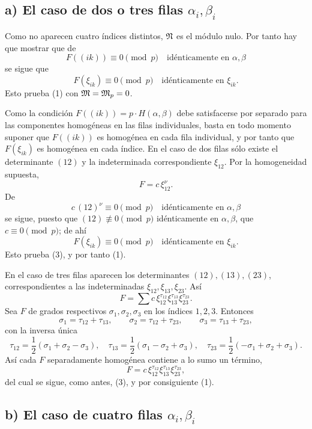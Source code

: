 \subsection*{a) El caso de dos o tres filas \(\alpha_i,\beta_i\)}

Como no aparecen cuatro índices distintos, \(\mathfrak N\) es el módulo nulo. Por tanto hay que mostrar que de
\begin{equation}
        F((ik))\equiv0\pmod p\quad \text{idénticamente en \(\alpha,\beta\)}
\end{equation}
se sigue que
\[
        F(\xi_{ik})\equiv0\pmod p\quad \text{idénticamente en \(\xi_{ik}\)}.
\]
Esto prueba (1) con \(\mathfrak M=\mathfrak M_p=0\).

Como la condición \(F((ik))=p\cdot H(\alpha,\beta)\) debe satisfacerse por separado para las componentes homogéneas en las filas individuales, basta en todo momento suponer que \(F((ik))\) es homogénea en cada fila individual, y por tanto que \(F(\xi_{ik})\) es homogénea en cada índice. En el caso de dos filas sólo existe el determinante \((12)\) y la indeterminada correspondiente \(\xi_{12}\). Por la homogeneidad supuesta,
\[
        F=c\,\xi_{12}^\nu.
\]
De
\[
        c\,(12)^\nu\equiv0\pmod p\quad \text{idénticamente en \(\alpha,\beta\)}
\]
se sigue, puesto que \((12)\not\equiv0\pmod p\) idénticamente en \(\alpha,\beta\), que \(c\equiv0\pmod p\); de ahí
\[
        F(\xi_{ik})\equiv0\pmod p\quad \text{idénticamente en \(\xi_{ik}\)}.
\]
Esto prueba (3), y por tanto (1).

En el caso de tres filas aparecen los determinantes \((12),(13),(23)\), correspondientes a las indeterminadas \(\xi_{12},\xi_{13},\xi_{23}\). Así
\[
        F=\sum c\,\xi_{12}^{\tau_{12}}\xi_{13}^{\tau_{13}}\xi_{23}^{\tau_{23}}.
\]
Sea \(F\) de grados respectivos \(\sigma_1,\sigma_2,\sigma_3\) en los índices \(1,2,3\). Entonces
\[
        \sigma_1=\tau_{12}+\tau_{13},\qquad
        \sigma_2=\tau_{12}+\tau_{23},\qquad
        \sigma_3=\tau_{13}+\tau_{23},
\]
con la inversa única
\[
        \tau_{12}=\frac12(\sigma_1+\sigma_2-\sigma_3),\quad
        \tau_{13}=\frac12(\sigma_1-\sigma_2+\sigma_3),\quad
        \tau_{23}=\frac12(-\sigma_1+\sigma_2+\sigma_3).
\]
Así cada \(F\) separadamente homogénea contiene a lo sumo un término,
\[
        F=c\,\xi_{12}^{\tau_{12}}\xi_{13}^{\tau_{13}}\xi_{23}^{\tau_{23}},
\]
del cual se sigue, como antes, (3), y por consiguiente (1).

\subsection*{b) El caso de cuatro filas \(\alpha_i,\beta_i\)}

